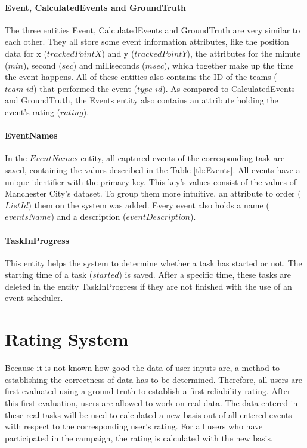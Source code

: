 \paragraph{Event, CalculatedEvents and GroundTruth}
The three entities Event, CalculatedEvents and GroundTruth are very similar to each other. They all store some event information attributes, like the position data for x ($trackedPointX$) and y ($trackedPointY$), the attributes for the minute ($min$), second ($sec$) and milliseconds ($msec$), which together make up the time the event happens. All of these entities also contains the ID of the teams ($team\_id$) that performed the event ($type\_id$).
As compared to CalculatedEvents and GroundTruth, the Events entity also contains an attribute holding the event's rating ($rating$).

\paragraph{EventNames}
In the $EventNames$ entity, all captured events of the corresponding task are saved, containing the values described in the Table \ref{tb:Events}. All events have a unique identifier with the primary key. This key's values consist of the values of Manchester City's dataset.
To group them more intuitive, an attribute to order ($ListId$) them on the system was added. Every event also holds a name ($eventsName$) and a description ($eventDescription$).

\paragraph{TaskInProgress}

This entity helps the system to determine whether a task has started or not. The starting time of a task ($started$) is saved. After a specific time, these tasks are deleted in the entity TaskInProgress if they are not finished with the use of an event scheduler.


\newpage

\section{Rating System} \label{RatingSystem}

Because it is not known how good the data of user inputs are, a method to establishing the correctness of data has to be determined.
Therefore, all users are first evaluated using a ground truth to establish a first reliability rating.
\newline
After this first evaluation, users are allowed to work on real data. 
The data entered in these real tasks will be used to calculated a new basis out of all entered events with respect to the corresponding user's rating.
For all users who have participated in the campaign, the rating is calculated with the new basis.

